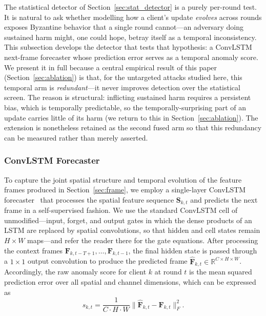 \documentclass[journal]{IEEEtran}
\begin{document}
The statistical detector of Section~\ref{sec:stat_detector} is a purely per-round test. It is natural to ask whether modelling how a client's update \emph{evolves} across rounds exposes Byzantine behavior that a single round cannot---an adversary doing sustained harm might, one could hope, betray itself as a temporal inconsistency. This subsection develops the detector that tests that hypothesis: a ConvLSTM next-frame forecaster whose prediction error serves as a temporal anomaly score. We present it in full because a central empirical result of this paper (Section~\ref{sec:ablation}) is that, for the untargeted attacks studied here, this temporal arm is \emph{redundant}---it never improves detection over the statistical screen. The reason is structural: inflicting sustained harm requires a persistent bias, which is temporally predictable, so the temporally-surprising part of an update carries little of its harm (we return to this in Section~\ref{sec:ablation}). The extension is nonetheless retained as the second fused arm so that this redundancy can be measured rather than merely asserted.

\subsubsection{ConvLSTM Forecaster}
To capture the joint spatial structure and temporal evolution of the feature frames produced in Section~\ref{sec:frame}, we employ a single-layer ConvLSTM forecaster~\cite{shi2015convolutional} that processes the spatial feature sequence $\mathbf{S}_{k,t}$ and predicts the next frame in a self-supervised fashion. We use the standard ConvLSTM cell of~\cite{shi2015convolutional} unmodified---input, forget, and output gates in which the dense products of an LSTM are replaced by spatial convolutions, so that hidden and cell states remain $H \times W$ maps---and refer the reader there for the gate equations. After processing the context frames $\mathbf{F}_{k,t-T+1}, \ldots, \mathbf{F}_{k,t-1}$, the final hidden state is passed through a $1 \times 1$ output convolution to produce the predicted frame $\hat{\mathbf{F}}_{k,t} \in \mathbb{R}^{C \times H \times W}$. Accordingly, the raw anomaly score for client $k$ at round $t$ is the mean squared prediction error over all spatial and channel dimensions, which can be expressed as
\begin{equation}
s_{k,t} = \frac{1}{C \cdot H \cdot W} \|\hat{\mathbf{F}}_{k,t} - \mathbf{F}_{k,t}\|_F^2.
\label{eq:anomaly_score}
\end{equation}
\end{document}
